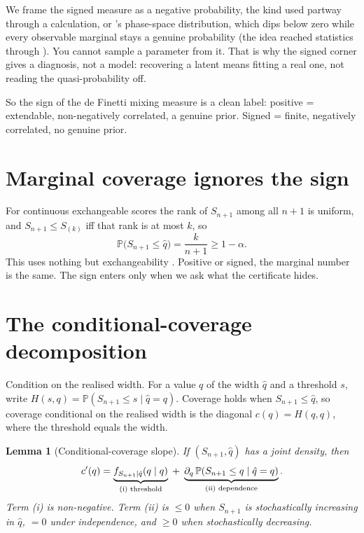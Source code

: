 \documentclass[11pt]{article}
\newtheorem{lemma}{Lemma}
\begin{document}
We frame the signed measure as a negative probability, the kind \citet{feynman1987} used
partway through a calculation, or \citet{wigner1932}'s phase-space distribution, which dips
below zero while every observable marginal stays a genuine probability (the idea reached
statistics through \citealp{bartlett1945}). You cannot sample a parameter from it. That is why
the signed corner gives a diagnosis, not a model: recovering a latent means fitting a real one,
not reading the quasi-probability off.

So the sign of the de Finetti mixing measure is a clean label: positive = extendable,
non-negatively correlated, a genuine prior. Signed = finite, negatively correlated,
no genuine prior.

\section{Marginal coverage ignores the sign}

For continuous exchangeable scores the rank of $S_{n+1}$ among all $n+1$ is uniform, and
$S_{n+1}\le S_{(k)}$ iff that rank is at most $k$, so
\begin{equation}
\mathbb P\big(S_{n+1}\le\hat q\big)=\frac{k}{n+1}\ge 1-\alpha .
\end{equation}
This uses nothing but exchangeability \citep{vovk2005}. Positive or signed, the marginal
number is the same. The sign enters only when we ask what the certificate hides.

\section{The conditional-coverage decomposition}

Condition on the realised width. For a value $q$ of the width $\hat q$ and a threshold $s$, write
$H(s,q)=\mathbb P(S_{n+1}\le s\mid\hat q=q)$. Coverage holds when $S_{n+1}\le\hat q$, so coverage
conditional on the realised width is the diagonal $c(q)=H(q,q)$, where the threshold equals the
width.

\begin{lemma}[Conditional-coverage slope]\label{lem:slope}
If $(S_{n+1},\hat q)$ has a joint density, then
\begin{equation}
c'(q)=\underbrace{f_{S_{n+1}\mid\hat q}(q\mid q)}_{\textup{(i) threshold}}
\;+\;\underbrace{\partial_q\,\mathbb P(S_{n+1}\le q\mid\hat q=q)}_{\textup{(ii) dependence}} .
\end{equation}
Term \textup{(i)} is non-negative. Term \textup{(ii)} is $\le 0$ when $S_{n+1}$ is
stochastically increasing in $\hat q$, $=0$ under independence, and $\ge 0$ when stochastically
decreasing.
\end{lemma}
\end{document}
